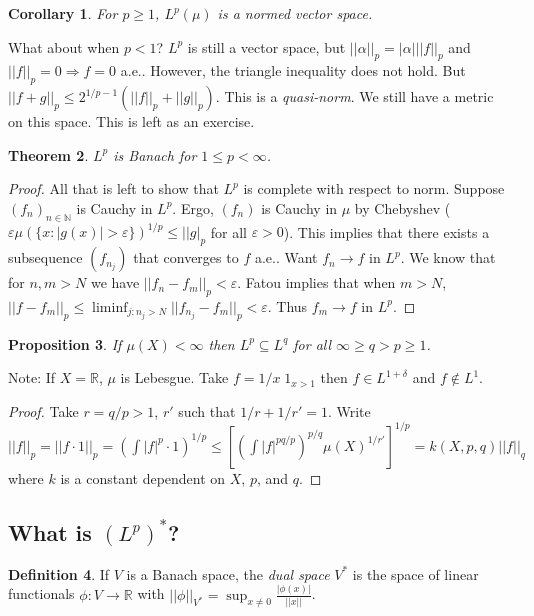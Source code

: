 \documentclass{article}
\newtheorem{theorem}{Theorem}[section]
\newtheorem{proposition}[theorem]{Proposition}
\newtheorem{corollary}[theorem]{Corollary}
\theoremstyle{definition}
\newtheorem{definition}[theorem]{Definition}
\begin{document}
\begin{corollary}
    For $p\geq 1$, $L^p(\mu)$ is a normed vector space.
\end{corollary}

What about when $p<1$? $L^p$ is still a vector space, but $||\alpha||_p=|\alpha|||f||_p$ and $||f||_p=0\Rightarrow f=0$ a.e..
However, the triangle inequality does not hold. But $||f+g||_p\leq 2^{1/p-1} (||f||_p+||g||_p)$. This is a \textit{quasi-norm}.
We still have a metric on this space. This is left as an exercise.

\begin{theorem}
    $L^p$ is Banach for $1\leq p< \infty$.
\end{theorem}
\begin{proof}
    All that is left to show that $L^p$ is complete with respect to norm. Suppose $(f_n)_{n\in\mathbb{N}}$ is Cauchy in $L^p$. Ergo,
    $(f_n)$ is Cauchy in $\mu$ by Chebyshev ($\varepsilon \mu(\{x:|g(x)|>\varepsilon\})^{1/p}\leq ||g|_p$ for all $\varepsilon>0$).
    This implies that there exists a subsequence $(f_{n_j})$ that converges to $f$ a.e.. Want $f_n\to f$ in $L^p$.
    We know that for $n,m>N$ we have $||f_n-f_m||_p<\varepsilon$. Fatou implies that when $m>N$,
    $||f-f_m||_p \leq \liminf_{j:n_j>N} ||f_{n_j}-f_m||_p<\varepsilon$. Thus $f_m\to f$ in $L^p$.
\end{proof}

\begin{proposition}
    If $\mu(X)<\infty$ then $L^p\subseteq L^q$ for all $\infty\geq q>p\geq 1$.
\end{proposition}

Note: If $X=\mathbb{R}$, $\mu$ is Lebesgue. Take $f=1/x\; 1_{x>1}$ then $f\in L^{1+\delta}$ and $f\notin L^1$.

\begin{proof}
    Take $r=q/p>1$, $r'$ such that $1/r+1/r'=1$.
    Write
    $||f||_p=||f\cdot 1||_p=\left(\int |f|^p\cdot 1\right)^{1/p}\leq \left[\left(\int|f|^{pq/p}\right)^{p/q}\mu(X)^{1/r'} \right]^{1/p}=k(X,p,q)||f||_q$
    where $k$ is a constant dependent on $X$, $p$, and $q$.
\end{proof}

\subsection{What is $(L^p)^*$?}

\begin{definition}
    If $V$ is a Banach space, the \textit{dual space} $V^*$ is the space of linear functionals $\phi:V\rightarrow\mathbb{R}$ with
    $||\phi||_{V^*}=\sup_{x\neq 0}\frac{|\phi(x)|}{||x||}$.
\end{definition}
\end{document}
